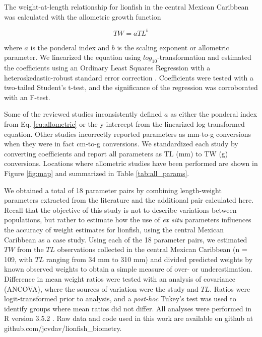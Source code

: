 \documentclass[fleqn,10pt,lineno]{wlpeerj} %
\begin{document}
The weight-at-length relationship for lionfish in the central Mexican
Caribbean was calculated with the allometric growth function

\begin{equation}
\label{eq:allometric}
TW = aTL^b
\end{equation}

where \(a\) is the ponderal index and \(b\) is the scaling exponent or
allometric parameter. We linearized the equation using
\(log_{10}\)-transformation and estimated the coefficients using an
Ordinary Least Squares Regression with a heteroskedastic-robust standard
error correction \citep{zeileis_2004}. Coefficients were tested with a
two-tailed Student's t-test, and the significance of the regression was
corroborated with an F-test.

Some of the reviewed studies inconsistently defined \(a\) as either the
ponderal index from Eq. \ref{eq:allometric} or the y-intercept from the
linearized log-transformed equation. Other studies incorrectly reported
parameters as mm-to-g conversions when they were in fact cm-to-g
conversions. We standardized each study by converting coefficients and
report all parameters as TL (mm) to TW (g) conversions. Locations where
allometric studies have been performed are shown in Figure \ref{fig:map}
and summarized in Table \ref{tab:all_params}.

We obtained a total of 18 parameter pairs by combining length-weight
parameters extracted from the literature and the additional pair
calculated here. Recall that the objective of this study is not to
describe variations between populations, but rather to estimate how the
use of \emph{ex situ} parameters influences the accuracy of weight
estimates for lionfish, using the central Mexican Caribbean as a case
study. Using each of the 18 parameter pairs, we estimated \(TW\) from
the \(TL\) observations collected in the central Mexican Caribbean (n =
109, with \(TL\) ranging from 34 mm to 310 mm) and divided predicted
weights by known observed weights to obtain a simple measure of over- or
underestimation. Difference in mean weight ratios were tested with an
analysis of covariance (ANCOVA), where the sources of variation were the
study and \(TL\). Ratios were logit-transformed prior to analysis, and a
\emph{post-hoc} Tukey's test was used to identify groups where mean
ratios did not differ. All analyses were performed in R version 3.5.2
\citep{rcore_2018}. Raw data and code used in this work are available on
github at github.com/jcvdav/lionfish\_biometry.
\end{document}
